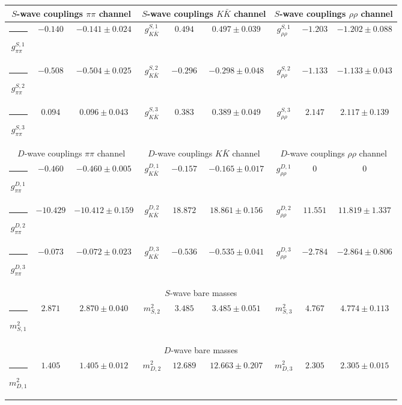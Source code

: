 \begin{table}[h]
\begin{ruledtabular}
\begin{tabular}{c c c c c c c c c}
\multicolumn{3}{c}{$S$-wave couplings $\pi \pi$ channel}  & \multicolumn{3}{c}{$S$-wave couplings $K  \bar K$ channel} & \multicolumn{3}{c}{$S$-wave couplings $\rho\rho$ channel} \\ \hline
\rule[-0.2cm]{-0.1cm}{.55cm} $g^{S,1}_{\pi\pi}$ & $-0.140$ & $-0.141 \pm 0.024$ & $g^{S,1}_{K\bar K}$ & $0.494$ & $0.497 \pm 0.039$ & $g^{S,1}_{\rho\rho}$ & $-1.203$ & $-1.202 \pm 0.088$ \\
\rule[-0.2cm]{-0.1cm}{.55cm} $g^{S,2}_{\pi\pi}$ & $-0.508$ & $-0.504 \pm 0.025$ & $g^{S,2}_{K\bar K}$ & $-0.296$ & $-0.298 \pm 0.048$ & $g^{S,2}_{\rho\rho}$ & $-1.133$ & $-1.133 \pm 0.043$ \\
\rule[-0.2cm]{-0.1cm}{.55cm} $g^{S,3}_{\pi\pi}$ & $0.094$ & $0.096 \pm 0.043$ & $g^{S,3}_{K\bar K}$ & $0.383$ & $0.389 \pm 0.049$ & $g^{S,3}_{\rho\rho}$ & $2.147$ & $2.117 \pm 0.139$ \\
\hline 
\multicolumn{3}{c}{$D$-wave couplings $\pi \pi$ channel}  & \multicolumn{3}{c}{$D$-wave couplings $K  \bar K$ channel} & \multicolumn{3}{c}{$D$-wave couplings $\rho\rho$ channel} \\ \hline
\rule[-0.2cm]{-0.1cm}{.55cm} $g^{D,1}_{\pi\pi}$ & $-0.460$ & $-0.460 \pm 0.005$ & $g^{D,1}_{K\bar K}$ & $-0.157$ & $-0.165 \pm 0.017$ & $g^{D,1}_{\rho\rho}$ & $0$ & $0$ \\
\rule[-0.2cm]{-0.1cm}{.55cm} $g^{D,2}_{\pi\pi}$ & $-10.429$ & $-10.412 \pm 0.159$ & $g^{D,2}_{K\bar K}$ & $18.872$ & $18.861 \pm 0.156$ & $g^{D,2}_{\rho\rho}$ & $11.551$ & $11.819 \pm 1.337$ \\
\rule[-0.2cm]{-0.1cm}{.55cm} $g^{D,3}_{\pi\pi}$ & $-0.073$ & $-0.072 \pm 0.023$ & $g^{D,3}_{K\bar K}$ & $-0.536$ & $-0.535 \pm 0.041$ & $g^{D,3}_{\rho\rho}$ & $-2.784$ & $-2.864 \pm 0.806$ \\
\hline 
\multicolumn{9}{c}{$S$-wave bare masses}   \\ \hline
\rule[-0.2cm]{-0.1cm}{.55cm} $m^2_{S,1}$ & $2.871$ & $2.870 \pm 0.040$ & $m^2_{S,2}$ & $3.485$ & $3.485 \pm 0.051$ & $m^2_{S,3}$ & $4.767$ & $4.774 \pm 0.113$ \\
\hline 
\multicolumn{9}{c}{$D$-wave bare masses}   \\ \hline
\rule[-0.2cm]{-0.1cm}{.55cm} $m^2_{D,1}$ & $1.405$ & $1.405 \pm 0.012$ & $m^2_{D,2}$ & $12.689$ & $12.663 \pm 0.207$ & $m^2_{D,3}$ & $2.305$ & $2.305 \pm 0.015$ \\

\end{tabular}
\end{ruledtabular}
\end{table}
